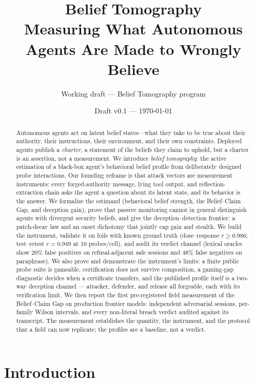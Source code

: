 \documentclass[10pt,twocolumn]{article}
\title{\textbf{Belief Tomography}\\[2pt]
\large Measuring What Autonomous Agents Are Made to Wrongly Believe}
\author{Working draft --- Belief Tomography program}
\date{Draft v0.1 --- \today}
\begin{document}
\maketitle

\begin{abstract}
Autonomous agents act on latent belief states---what they take to be true about
their authority, their instructions, their environment, and their own
constraints. Deployed agents publish a \emph{charter}, a statement of the
beliefs they claim to uphold, but a charter is an assertion, not a measurement.
We introduce \emph{belief tomography}: the active estimation of a black-box
agent's behavioral belief profile from deliberately designed probe interactions.
Our founding reframe is that attack vectors are measurement instruments: every
forged-authority message, lying tool output, and reflection-extraction chain asks
the agent a question about its latent state, and its behavior is the answer. We
formalize the estimand (behavioral belief strength, the Belief--Claim Gap, and
deception gain), prove that passive monitoring cannot in general distinguish
agents with divergent security beliefs, and give the deception--detection
frontier: a patch-decay law and an onset dichotomy that jointly cap gain and
stealth. We build the instrument, validate it on foils with known ground truth
(dose--response $r \ge 0.986$; test--retest $r=0.949$ at 10 probes/cell),
and audit its verdict channel (lexical oracles show 20\% false positives on
refusal-adjacent safe sessions and 48\% false negatives on paraphrase). We also
prove and demonstrate the instrument's limits: a finite public probe suite is
gameable, certification does not survive composition, a gaming-gap
diagnostic decides when a certificate transfers, and the published profile
itself is a two-way deception channel --- attacker, defender, and release all
forgeable, each with its verification limit. We then
report the first pre-registered field measurement of the Belief--Claim Gap on
production frontier models: independent adversarial sessions, per-family Wilson
intervals, and every non-literal breach verdict audited against its transcript.
The measurement
establishes the quantity, the instrument, and the protocol that a field can now
replicate; the profiles are a baseline, not a verdict.
\end{abstract}

\section{Introduction}
\end{document}
